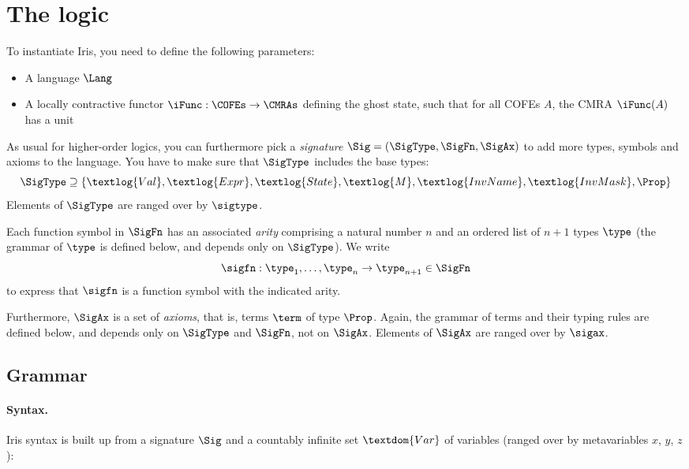 \clearpage
\section{The logic}

To instantiate Iris, you need to define the following parameters:
\begin{itemize}
\item A language $\Lang$
\item A locally contractive functor $\iFunc : \COFEs \to \CMRAs$ defining the ghost state, such that for all COFEs $A$, the CMRA $\iFunc(A)$ has a unit
\end{itemize}

\noindent
As usual for higher-order logics, you can furthermore pick a \emph{signature} $\Sig = (\SigType, \SigFn, \SigAx)$ to add more types, symbols and axioms to the language.
You have to make sure that $\SigType$ includes the base types:
\[
	\SigType \supseteq \{ \textlog{Val}, \textlog{Expr}, \textlog{State}, \textlog{M}, \textlog{InvName}, \textlog{InvMask}, \Prop \}
\]
Elements of $\SigType$ are ranged over by $\sigtype$.

Each function symbol in $\SigFn$ has an associated \emph{arity} comprising a natural number $n$ and an ordered list of $n+1$ types $\type$ (the grammar of $\type$ is defined below, and depends only on $\SigType$).
We write
\[
	\sigfn : \type_1, \dots, \type_n \to \type_{n+1} \in \SigFn
\]
to express that $\sigfn$ is a function symbol with the indicated arity.

Furthermore, $\SigAx$ is a set of \emph{axioms}, that is, terms $\term$ of type $\Prop$.
Again, the grammar of terms and their typing rules are defined below, and depends only on $\SigType$ and $\SigFn$, not on $\SigAx$.
Elements of $\SigAx$ are ranged over by $\sigax$.

\subsection{Grammar}\label{sec:grammar}

\paragraph{Syntax.}
Iris syntax is built up from a signature $\Sig$ and a countably infinite set $\textdom{Var}$ of variables (ranged over by metavariables $x$, $y$, $z$):

